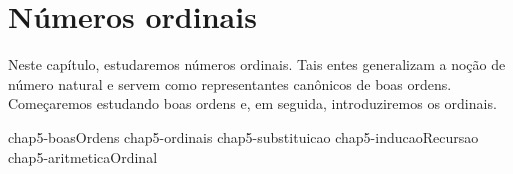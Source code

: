 \chapter{Números ordinais}\label{chap:numerosOrdinais}

Neste capítulo, estudaremos números ordinais.
Tais entes generalizam a noção de número natural e servem como representantes canônicos de boas ordens.
Começaremos estudando boas ordens e, em seguida, introduziremos os ordinais.

{chap5-boasOrdens}
{chap5-ordinais}
{chap5-substituicao}
{chap5-inducaoRecursao}
{chap5-aritmeticaOrdinal}
